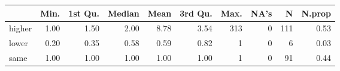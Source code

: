 \begin{table}[ht]
\centering
\begin{tabular}{lrrrrrrrrr}
  \hline
 & Min. & 1st Qu. & Median & Mean & 3rd Qu. & Max. & NA's & N & N.prop \\ 
  \hline
higher & 1.00 & 1.50 & 2.00 & 8.78 & 3.54 & 313 &   0 & 111 & 0.53 \\ 
  lower & 0.20 & 0.35 & 0.58 & 0.59 & 0.82 &   1 &   0 &   6 & 0.03 \\ 
  same & 1.00 & 1.00 & 1.00 & 1.00 & 1.00 &   1 &   0 &  91 & 0.44 \\ 
   \hline
\end{tabular}
\end{table}
